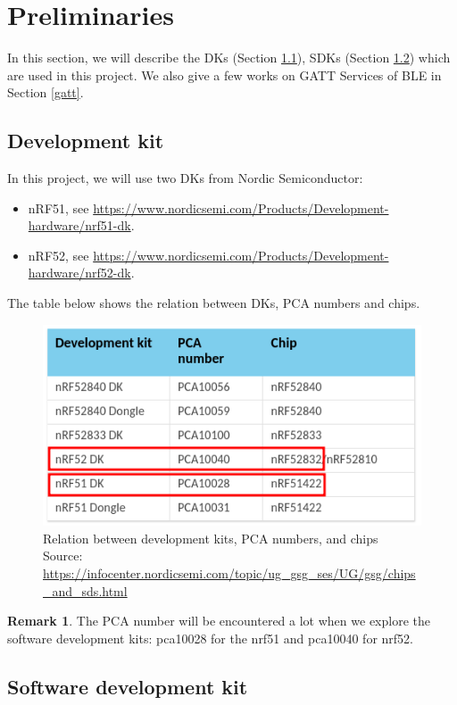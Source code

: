 \documentclass{article}
\theoremstyle{plain}
\theoremstyle{definition}
\newtheorem{remark}{Remark}
\numberwithin{equation}{section}
\begin{document}
\section{Preliminaries}\label{preliminaries}
In this section, we will describe the DKs (Section \ref{dk}), SDKs (Section \ref{sdk}) which are used in this project. We also give a few works on GATT Services of BLE in Section \ref{gatt}.
\subsection{Development kit}\label{dk}
In this project, we will use two DKs from Nordic Semiconductor:
\begin{itemize}
	\item nRF51, see \url{https://www.nordicsemi.com/Products/Development-hardware/nrf51-dk}.
	
	
\item nRF52, see \url{https://www.nordicsemi.com/Products/Development-hardware/nrf52-dk}.
\end{itemize}
The table below shows the relation between DKs, PCA numbers and chips.
\begin{figure}[H]
	\centering
	\includegraphics[width=0.7\linewidth]{images/DK-PCA-chip}
	\caption{Relation between development kits, PCA numbers, and chips\\
	\centering Source: \url{https://infocenter.nordicsemi.com/topic/ug_gsg_ses/UG/gsg/chips_and_sds.html}}	
	\label{fig:dk-pca-chip}
\end{figure}
\begin{remark}
	 The PCA number will be encountered a lot when we explore the software development kits: pca10028 for the nrf51 and pca10040 for nrf52.
\end{remark}

\subsection{Software development kit} \label{sdk}
\end{document}
